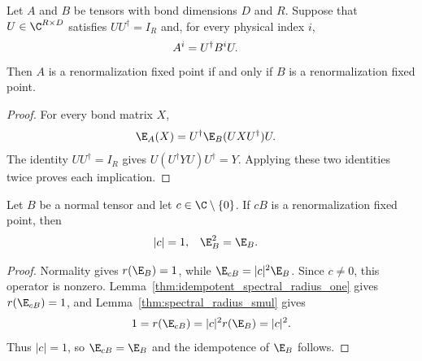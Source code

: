 \begin{lemma}%
    \label{thm:rfp_coisometry_reconstruction_iff}
    \leanok
    Let $A$ and $B$ be tensors with bond dimensions $D$ and $R$. Suppose that
    $U\in\C^{R\times D}$ satisfies $UU^\dagger=I_R$ and, for every physical
    index $i$,
    \begin{align}
        A^i & =U^\dagger B^iU.
        \notag
    \end{align}
    Then $A$ is a renormalization fixed point if and only if $B$ is a
    renormalization fixed point.
\end{lemma}
\begin{proof}\leanok
    For every bond matrix $X$,
    \begin{align}
        \E_A(X)
         & =U^\dagger\E_B(UXU^\dagger)U.
        \notag
    \end{align}
    The identity $UU^\dagger=I_R$ gives
    $U(U^\dagger YU)U^\dagger=Y$. Applying these two identities twice proves
    each implication.
\end{proof}

\begin{lemma}%
    \label{thm:normal_scaled_rfp}
    \leanok
    Let $B$ be a normal tensor and let $c\in\C\setminus\{0\}$. If $cB$ is a
    renormalization fixed point, then
    \begin{align}
        |c| & =1,
            & \E_B^2 & =\E_B.
        \notag
    \end{align}
\end{lemma}
\begin{proof}\leanok
    Normality gives $r(\E_B)=1$, while
    $\E_{cB}=|c|^2\E_B$. Since $c\ne0$, this operator is nonzero.
    Lemma~\ref{thm:idempotent_spectral_radius_one} gives
    $r(\E_{cB})=1$, and Lemma~\ref{thm:spectral_radius_smul} gives
    \begin{align}
        1=r(\E_{cB})=|c|^2r(\E_B)=|c|^2.
        \notag
    \end{align}
    Thus $|c|=1$, so $\E_{cB}=\E_B$ and the idempotence of $\E_B$ follows.
\end{proof}

